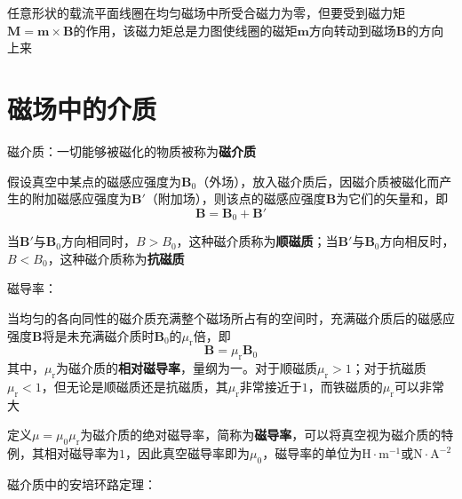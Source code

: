\documentclass[12pt, a4paper, twoside]{ctexbook}
\begin{document}
任意形状的载流平面线圈在均匀磁场中所受合磁力为零，但要受到磁力矩$\boldsymbol{M}=\boldsymbol{m}\times\boldsymbol{B}$的作用，该磁力矩总是力图使线圈的磁矩$\boldsymbol{m}$方向转动到磁场$\boldsymbol{B}$的方向上来

\section{磁场中的介质}
{\sonti 磁介质}：一切能够被磁化的物质被称为\textbf{磁介质}

假设真空中某点的磁感应强度为$\boldsymbol{B}_0$（外场），放入磁介质后，因磁介质被磁化而产生的附加磁感应强度为$\boldsymbol{B}'$（附加场），则该点的磁感应强度$\boldsymbol{B}$为它们的矢量和，即
$$
\boldsymbol{B}=\boldsymbol{B}_0+\boldsymbol{B}'
$$

当$\boldsymbol{B}'$与$\boldsymbol{B}_0$方向相同时，$B>B_0$，这种磁介质称为\textbf{顺磁质}；当$\boldsymbol{B}'$与$\boldsymbol{B}_0$方向相反时，$B<B_0$，这种磁介质称为\textbf{抗磁质}

{\sonti 磁导率}：

当均匀的各向同性的磁介质充满整个磁场所占有的空间时，充满磁介质后的磁感应强度$\boldsymbol{B}$将是未充满磁介质时$\boldsymbol{B}_0$的$\mu_\mathrm{r}$倍，即
$$
\boldsymbol{B}=\mu_\mathrm{r}\boldsymbol{B}_0
$$
其中，$\mu_\mathrm{r}$为磁介质的\textbf{相对磁导率}，量纲为一。对于顺磁质$\mu_\mathrm{r}>1$；对于抗磁质$\mu_\mathrm{r}<1$，但无论是顺磁质还是抗磁质，其$\mu_\mathrm{r}$非常接近于$1$，而铁磁质的$\mu_\mathrm{r}$可以非常大

定义$\mu=\mu_0\mu_\mathrm{r}$为磁介质的绝对磁导率，简称为\textbf{磁导率}，可以将真空视为磁介质的特例，其相对磁导率为$1$，因此真空磁导率即为$\mu_0$，磁导率的单位为$\mathrm{H}\cdot\mathrm{m}^{-1}$或$\mathrm{N}\cdot\mathrm{A}^{-2}$

{\sonti 磁介质中的安培环路定理}：
\end{document}
